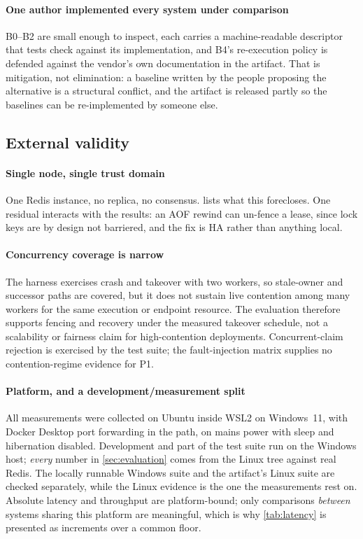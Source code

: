 \paragraph{One author implemented every system under comparison} B0--B2 are
small enough to inspect, each carries a machine-readable descriptor that tests
check against its implementation, and B4's re-execution policy is defended
against the vendor's own documentation in the artifact. That is mitigation, not
elimination: a baseline written by the people proposing the alternative is a
structural conflict, and the artifact is released partly so the baselines can be
re-implemented by someone else.

\subsection{External validity}

\paragraph{Single node, single trust domain} One Redis instance, no replica, no
consensus.  lists what this forecloses. One residual
interacts with the results: an AOF rewind can un-fence a lease, since lock keys
are by design not barriered, and the fix is HA rather than anything local.

\paragraph{Concurrency coverage is narrow} The harness exercises crash and
takeover with two workers, so stale-owner and successor paths are covered, but
it does not sustain live contention among many workers for the same execution or
endpoint resource. The evaluation therefore supports fencing and recovery under
the measured takeover schedule, not a scalability or fairness claim for
high-contention deployments. Concurrent-claim rejection is exercised by the test
suite; the fault-injection matrix supplies no contention-regime evidence for P1.

\paragraph{Platform, and a development/measurement split} All measurements were
collected on Ubuntu inside WSL2 on Windows~11, with Docker Desktop port
forwarding in the path, on mains power with sleep and hibernation disabled.
Development and part of the test suite run on the Windows host; \emph{every}
number in \cref{sec:evaluation} comes from the Linux tree against real Redis.
The locally runnable Windows suite and the artifact's Linux suite are checked
separately, while the Linux evidence is the one the measurements rest on.
Absolute latency and throughput are platform-bound; only comparisons
\emph{between} systems sharing this platform are meaningful, which is why
\cref{tab:latency} is presented as increments over a common floor.

